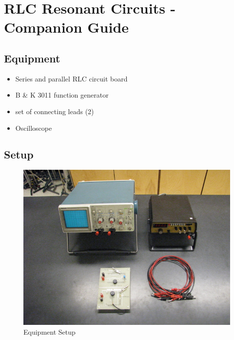 \AtEndDocument{\clearpage\ifodd\value{page}\else\null\clearpage\fi} %


\chapter{RLC Resonant Circuits - Companion Guide}

\section{Equipment}
\begin{minipage}[t]{0.6\textwidth}
\begin{itemize}[noitemsep]
\item Series and parallel RLC circuit board
\item B \& K 3011 function generator
\item set of connecting leads (2)
\end{itemize}
\end{minipage}
\begin{minipage}[t]{0.35\textwidth}
\begin{itemize}[noitemsep]
\item Oscilloscope
\end{itemize}
\end{minipage}


\section{Setup}
\begin{figure}
\includegraphics{RLC-Resonant-Circuits-Setup.jpg}
\caption{Equipment Setup}
\label{pic:RLCsetup}
\end{figure}

